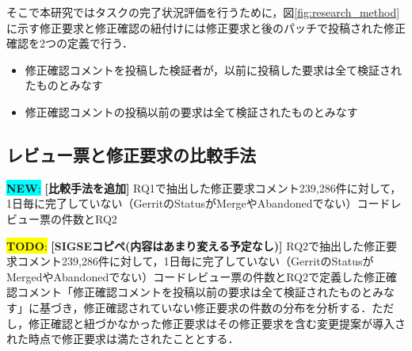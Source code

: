 \documentclass[11pt]{jreport}
\newcommand{\todo}[1]{\colorbox{yellow}{{\bf TODO}:}{\color{red} {\textbf{[#1]}}}}
\newcommand{\new}[1]{\colorbox{cyan}{{\bf NEW}:}{\color{black} {\textbf{[#1]}}}}
\begin{document}
そこで本研究ではタスクの完了状況評価を行うために，図\ref{fig:research_method}に示す修正要求と修正確認の紐付けには修正要求と後のパッチで投稿された修正確認を2つの定義で行う．

\begin{itemize}
\item 修正確認コメントを投稿した検証者が，以前に投稿した要求は全て検証されたものとみなす
\item 修正確認コメントの投稿以前の要求は全て検証されたものとみなす
\end{itemize}



\subsection{レビュー票と修正要求の比較手法}
\new{比較手法を追加}
RQ1で抽出した修正要求コメント239,286件に対して，1日毎に完了していない（GerritのStatusがMergeやAbandonedでない）コードレビュー票の件数とRQ2

\todo{SIGSEコピペ(内容はあまり変える予定なし)}
RQ2で抽出した修正要求コメント239,286件に対して，1日毎に完了していない（GerritのStatusがMergedやAbandonedでない）コードレビュー票の件数とRQ2で定義した修正確認コメント「修正確認コメントを投稿以前の要求は全て検証されたものとみなす」に基づき，修正確認されていない修正要求の件数の分布を分析する．ただし，修正確認と紐づかなかった修正要求はその修正要求を含む変更提案が導入された時点で修正要求は満たされたこととする．
\end{document}
